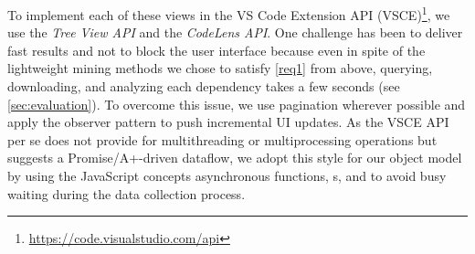 To implement each of these views in the VS Code Extension API (VSCE)\footnote{\url{https://code.visualstudio.com/api}}, we use the \emph{Tree View API} and the \emph{CodeLens API}.
One challenge has been to deliver fast results and not to block the user interface because even in spite of the lightweight mining methods we chose to satisfy \cref{req1} from above, querying, downloading, and analyzing each dependency takes a few seconds (see \cref{sec:evaluation}).
To overcome this issue, we use pagination wherever possible and apply the observer pattern to push incremental UI updates.
As the VSCE API per se does not provide for multithreading or multiprocessing operations but suggests a Promise/A+-driven dataflow, we adopt this style for our object model by using the JavaScript concepts asynchronous functions, s, and  to avoid busy waiting during the data collection process.
